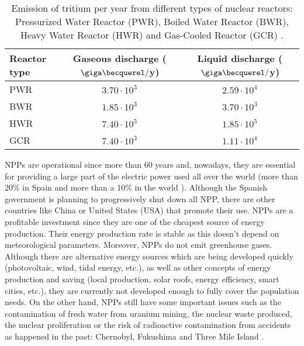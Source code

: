 \begin{table}[htbp]
\centering{}%
\begin{tabular}{lcc}
\toprule 
Reactor type & Gaseous discharge ($\giga\becquerel/$y) & Liquid discharge ($\giga\becquerel/$y)\tabularnewline
\midrule
\midrule 
PWR & $3.70\cdot 10^{3}$ & $2.59\cdot 10^{4}$ \tabularnewline
BWR & $1.85\cdot 10^{3}$ & $3.70\cdot 10^{3}$ \tabularnewline
HWR & $7.40\cdot 10^{5}$ & $1.85\cdot 10^{5}$ \tabularnewline
GCR & $7.40\cdot 10^{3}$ & $1.11\cdot 10^{4}$ \tabularnewline
\bottomrule
\end{tabular}
\caption{Emission of tritium per year from different types of nuclear reactors: Pressurized Water Reactor (PWR), Boiled Water Reactor (BWR), Heavy Water Reactor (HWR) and Gas-Cooled Reactor (GCR) \cite{CommonEmissionTritium}.}
\label{tab:TritiumEmisionsNPPs}
\end{table}

NPPs are operational since more than 60 years and, nowadays, they are essential for providing a large part of the electric power used all over the world (more than 20\% in Spain \cite{PercentageEnergySpain} and more than a 10\% in the world \cite{PercentageEnergyWorld}). Although the Spanish government is planning to progressively shut down all NPP, there are other countries like China \cite{60ReactorsChina} or United States (USA) \cite{35MillionsUSA} that promote their use. NPPs are a profitable investment since they are one of the cheapest source of energy production. Their energy production rate is stable as this doesn't depend on meteorological parameters. Moreover, NPPs do not emit greenhouse gases. Although there are alternative energy sources which are being developed quickly (photovoltaic, wind, tidal energy, etc.), as well as other concepts of energy production and saving (local production, solar roofs, energy efficiency, smart cities, etc.), they are currently not developed enough to fully cover the population needs. On the other hand, NPPs still have some important issues such as the contamination of fresh water from uranium mining, the nuclear waste produced, the nuclear proliferation or the risk of radioactive contamination from accidents as happened in the past: Chernobyl, Fukushima and Three Mile Island \cite{ThreeMileIsland}.

